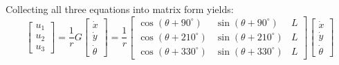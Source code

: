 \begin{enumerate}[label=\textbf{(\alph*)}]
    Collecting all three equations into matrix form yields:
    \begin{equation}
        \begin{bmatrix} u_1 \\ u_2 \\ u_3 \end{bmatrix} = \frac{1}{r} G \begin{bmatrix} \dot{x} \\ \dot{y} \\ \dot{\theta} \end{bmatrix} = \frac{1}{r} \begin{bmatrix}
            \cos(\theta + 90^\circ) & \sin(\theta + 90^\circ) & L \\
            \cos(\theta + 210^\circ) & \sin(\theta + 210^\circ) & L \\
            \cos(\theta + 330^\circ) & \sin(\theta + 330^\circ) & L
        \end{bmatrix} \begin{bmatrix} \dot{x} \\ \dot{y} \\ \dot{\theta} \end{bmatrix}
    \end{equation}


\end{enumerate}
